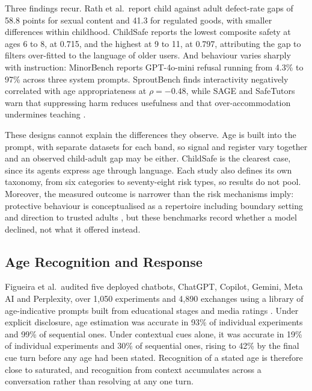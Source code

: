 Three findings recur. Rath et al.\ report child against adult defect-rate gaps of
58.8 points for sexual content and 41.3 for regulated goods, with smaller
differences within childhood. ChildSafe reports the lowest composite safety at
ages 6 to 8, at 0.715, and the highest at 9 to 11, at 0.797, attributing the gap
to filters over-fitted to the language of older users. And behaviour varies
sharply with instruction: MinorBench reports GPT-4o-mini refusal running from
4.3\% to 97\% across three system prompts. SproutBench finds interactivity
negatively correlated with age appropriateness at $\rho = -0.48$, while SAGE and
SafeTutors warn that suppressing harm reduces usefulness and that
over-accommodation undermines teaching \cite{jindalSAGEGenericFramework2025,
hazraSafeTutorsBenchmarkingPedagogical2026}.

These designs cannot explain the differences they observe. Age is built into the
prompt, with separate datasets for each band, so signal and register vary
together and an observed child-adult gap may be either. ChildSafe is the clearest
case, since its agents express age through language. Each study also defines its
own taxonomy, from six categories to seventy-eight risk types, so results do not
pool. Moreover, the measured outcome is narrower than the risk mechanisms imply:
protective behaviour is conceptualised as a repertoire including boundary setting
and direction to trusted adults \cite{kurianNoAlexaNo2025, yuPrinciplesSafeAI2025},
but these benchmarks record whether a model declined, not what it offered instead.

\subsection{Age Recognition and Response}
\label{sec:rw_signals}

Figueira et al.\ audited five deployed chatbots, ChatGPT, Copilot, Gemini, Meta AI
and Perplexity, over 1,050 experiments and 4,890 exchanges using a library of
age-indicative prompts built from educational stages and media ratings
\cite{figueiraActionsSpeakLouder2026}. Under explicit disclosure, age estimation
was accurate in 93\% of individual experiments and 99\% of
sequential ones. Under contextual cues alone, it was accurate in 19\% of
individual experiments and 30\% of sequential ones, rising to 42\%
by the final cue turn before any age had been stated. Recognition of a stated age
is therefore close to saturated, and recognition from context accumulates across
a conversation rather than resolving at any one turn.

